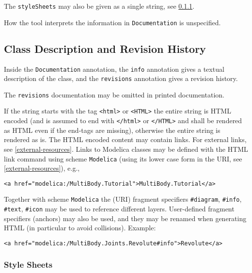 The \lstinline!styleSheets! may also be given as a single string, see \cref{style-sheets}.

How the tool interprets the information in \lstinline!Documentation! is unspecified.

\subsection{Class Description and Revision History}\label{annotation-info-revisions}

Inside the \lstinline!Documentation! annotation, the \lstinline!info! annotation gives a textual description of the class, and the \lstinline!revisions! annotation gives a revision history.

\begin{nonnormative}
The \lstinline!revisions! documentation may be omitted in printed documentation.
\end{nonnormative}

If the string starts with the tag \lstinline!<html>! or \lstinline!<HTML>! the entire string is HTML encoded (and is assumed to end with \lstinline!</html>! or \lstinline!</HTML>! and shall be rendered as HTML even if the end-tags are missing), otherwise the entire string is rendered as is.
The HTML encoded content may contain links.
For external links, see \cref{external-resources}.
Links to Modelica classes may be defined with the HTML link command using scheme \lstinline!Modelica! (using its lower case form in the URI, see \cref{external-resources}), e.g.,
\begin{lstlisting}[language=modelica]
<a href="modelica:/MultiBody.Tutorial">MultiBody.Tutorial</a>
\end{lstlisting}

Together with scheme \lstinline!Modelica! the (URI) fragment specifiers \lstinline!#diagram!, \lstinline!#info!, \lstinline!#text!, \lstinline!#icon! may be used to reference different layers.
User-defined fragment specifiers (anchors) may also be used, and they may be renamed when generating HTML (in particular to avoid collisions).
Example:
\begin{lstlisting}[language=modelica]
<a href="modelica:/MultiBody.Joints.Revolute#info">Revolute</a>
\end{lstlisting}

\subsubsection{Style Sheets}\label{style-sheets}

